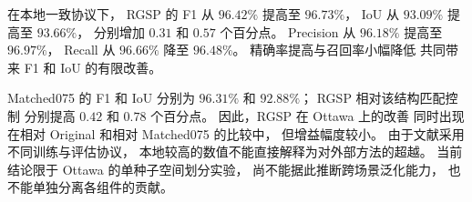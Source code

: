 在本地一致协议下，
RGSP 的 F1 从 $96.42\%$ 提高至 $96.73\%$，
IoU 从 $93.09\%$ 提高至 $93.66\%$，
分别增加 $0.31$ 和 $0.57$ 个百分点。
Precision 从 $96.18\%$ 提高至 $96.97\%$，
Recall 从 $96.66\%$ 降至 $96.48\%$。
精确率提高与召回率小幅降低
共同带来 F1 和 IoU 的有限改善。

Matched075 的 F1 和 IoU
分别为 $96.31\%$ 和 $92.88\%$；
RGSP 相对该结构匹配控制
分别提高 $0.42$ 和 $0.78$ 个百分点。
因此，RGSP 在 Ottawa 上的改善
同时出现在相对 Original
和相对 Matched075 的比较中，
但增益幅度较小。
由于文献采用不同训练与评估协议，
本地较高的数值不能直接解释为对外部方法的超越。
当前结论限于 Ottawa 的单种子空间划分实验，
尚不能据此推断跨场景泛化能力，
也不能单独分离各组件的贡献。

\FloatBarrier
